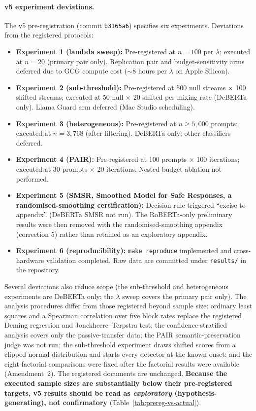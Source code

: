 \documentclass{article}
\begin{document}
\paragraph{v5 experiment deviations.} The v5 pre-registration (commit \texttt{b3165a6}) specifies six experiments. Deviations from the registered protocols:
\begin{itemize}
\item \textbf{Experiment 1 (lambda sweep):} Pre-registered at $n{=}100$ per $\lambda$; executed at $n{=}20$ (primary pair only). Replication pair and budget-sensitivity arms deferred due to GCG compute cost (${\sim}$8 hours per $\lambda$ on Apple Silicon).
\item \textbf{Experiment 2 (sub-threshold):} Pre-registered at 500 null streams $\times$ 100 shifted streams; executed at 50 null $\times$ 20 shifted per mixing rate (DeBERTa only). Llama Guard arm deferred (Mac Studio scheduling).
\item \textbf{Experiment 3 (heterogeneous):} Pre-registered at $n{\geq}5{,}000$ prompts; executed at $n{=}3{,}768$ (after filtering). DeBERTa only; other classifiers deferred.
\item \textbf{Experiment 4 (PAIR):} Pre-registered at 100 prompts $\times$ 100 iterations; executed at 30 prompts $\times$ 20 iterations. Nested budget ablation not performed.
\item \textbf{Experiment 5 (SMSR, Smoothed Model for Safe Responses, a randomised-smoothing certification):} Decision rule triggered ``excise to appendix'' (DeBERTa SMSR not run). The RoBERTa-only preliminary results were then removed with the randomised-smoothing appendix (correction 5) rather than retained as an exploratory appendix.
\item \textbf{Experiment 6 (reproducibility):} \texttt{make reproduce} implemented and cross-hardware validation completed. Raw data are committed under \texttt{results/} in the repository.
\end{itemize}
Several deviations also reduce scope (the sub-threshold and heterogeneous experiments are DeBERTa only; the $\lambda$ sweep covers the primary pair only). The analysis procedures differ from those registered beyond sample size: ordinary least squares and a Spearman correlation over five block rates replace the registered Deming regression and Jonckheere--Terpstra test; the confidence-stratified analysis covers only the passive-transfer data; the PAIR semantic-preservation judge was not run; the sub-threshold experiment draws shifted scores from a clipped normal distribution and starts every detector at the known onset; and the eight factorial comparisons were fixed after the factorial results were available (Amendment~2). The registered documents are unchanged. \textbf{Because the executed sample sizes are substantially below their pre-registered targets, v5 results should be read as \emph{exploratory} (hypothesis-generating), not confirmatory} (Table~\ref{tab:prereg-vs-actual}).
\end{document}
